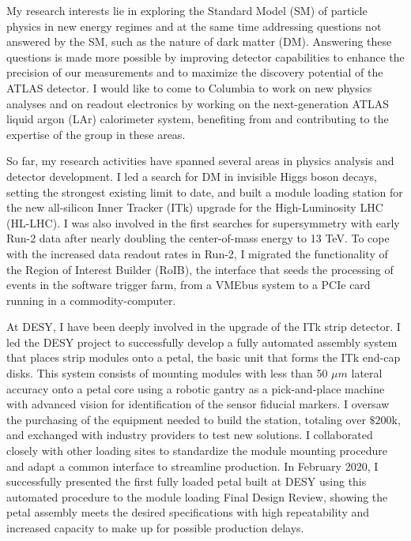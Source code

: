 \documentclass[a4paper]{article}
\begin{document}
\thispagestyle{fancy} 
 \lfoot{} \rfoot{\bf \thepage} \cfoot{}

\fontsize{11}{14}
\selectfont


My research interests lie in exploring the Standard Model (SM) of particle physics in new energy regimes
and at the same time addressing questions not answered by the SM, such as
the nature of dark matter (DM).
Answering these questions is made more possible by improving detector capabilities to enhance the precision of our measurements and to maximize the discovery potential of the ATLAS detector. I would like to come to Columbia to work on new physics analyses and on readout electronics by working on the next-generation ATLAS liquid argon (LAr) calorimeter system, benefiting from and contributing to the expertise of the group in these areas.

So far, my research activities have spanned several areas in physics analysis and detector development. I led a search for DM in invisible Higgs boson decays, setting the strongest existing limit to date, and built a module loading station for the new all-silicon Inner Tracker (ITk) upgrade for the High-Luminosity LHC (HL-LHC). I was also involved in the first searches for supersymmetry with early Run-2 data after nearly doubling the center-of-mass energy to 13 TeV. To cope with the increased data readout rates in Run-2, I migrated the functionality of the Region of Interest Builder (RoIB), the interface that seeds the processing of events in the software trigger farm, from a VMEbus system to a PCIe card running in a commodity-computer.

At DESY, I have been deeply involved in the upgrade of the ITk strip detector\cite{ITKstrips}. I led the DESY project to successfully develop a fully automated assembly system that places strip modules onto a petal, the basic unit that forms the ITk end-cap disks. This system consists of mounting modules with less than 50 $\mu m$ lateral accuracy onto a petal core using a robotic gantry as a pick-and-place machine with advanced vision for identification of the sensor fiducial markers. I oversaw the purchasing of the equipment needed to build the station, totaling over $\$200$k, and exchanged with industry providers to test new solutions. I collaborated closely with other loading sites to standardize the module mounting procedure and adapt a common interface to streamline production. In February 2020, I successfully presented the first fully loaded petal built at DESY using this automated procedure to the module loading Final Design Review, showing the petal assembly meets the desired specifications with high repeatability and increased capacity to make up for possible production delays.
\end{document}
